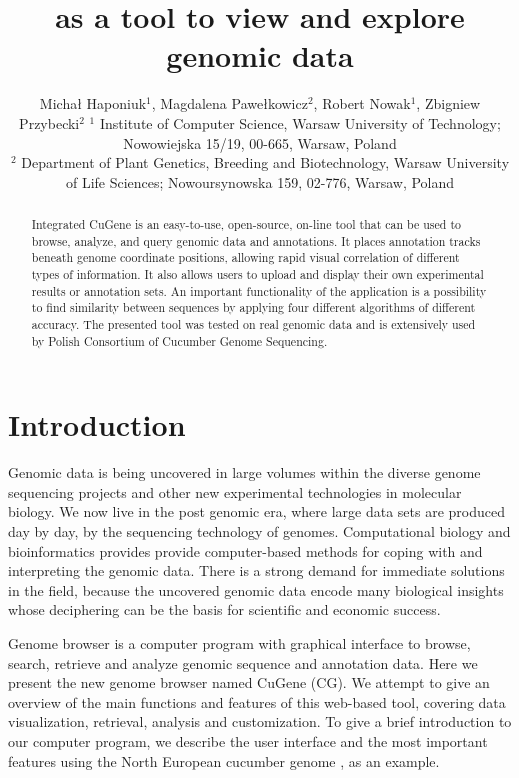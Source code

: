 \documentclass[a4paper]{spie}
\title{\appName{} as a tool to view and explore genomic data}
\author{Michał Haponiuk$^{1}$, Magdalena Pawełkowicz$^{2}$, Robert Nowak$^{1}$, Zbigniew Przybecki$^{2}$
  \skiplinehalf
  $^{1}$ Institute of Computer Science, Warsaw University of Technology; Nowowiejska 15/19, 00-665, Warsaw, Poland\\
  $^{2}$ Department of Plant Genetics, Breeding and Biotechnology, Warsaw University of Life Sciences; Nowoursynowska 159, 02-776, Warsaw, Poland\\
}
\newcommand{\appName}{CuGene}
\newcommand{\appShortcut}{CG}
\begin{document}
\maketitle

\begin{abstract}
  Integrated \appName{} is an easy-to-use, open-source, on-line tool that can be used to browse, analyze,
  and query genomic data and annotations.
  It places annotation tracks beneath genome coordinate positions, allowing rapid visual correlation of different types of information.
  It also allows users to upload and display their own experimental results or annotation sets.
  An important functionality of the application is a possibility to find similarity between sequences by applying four different algorithms of different accuracy.
  The presented tool was tested on real genomic data and is extensively used by Polish Consortium of Cucumber Genome Sequencing.
\end{abstract}


\section{Introduction}

Genomic data is being uncovered in large volumes within the diverse genome sequencing projects and other new experimental technologies in molecular biology.
We now live in the post genomic era, where large data sets are produced day by day, by the sequencing technology of genomes.
Computational biology and bioinformatics provides provide computer-based methods for coping with and interpreting the genomic data.
There is a strong demand for immediate solutions in the field,
because the uncovered genomic data encode many biological insights whose deciphering can be the basis for scientific and economic success.

Genome browser is a computer program with graphical interface to browse, search, retrieve and analyze genomic sequence and annotation data.
Here we present the new genome browser named \appName{} (\appShortcut).
We attempt to give an overview of the main functions and features of this web-based tool,
covering data visualization, retrieval, analysis and customization.
To give a brief introduction to our computer program, we describe the user interface and the most important features
using the North European cucumber genome \cite{woycicki2011genome}, as an example.
\end{document}
